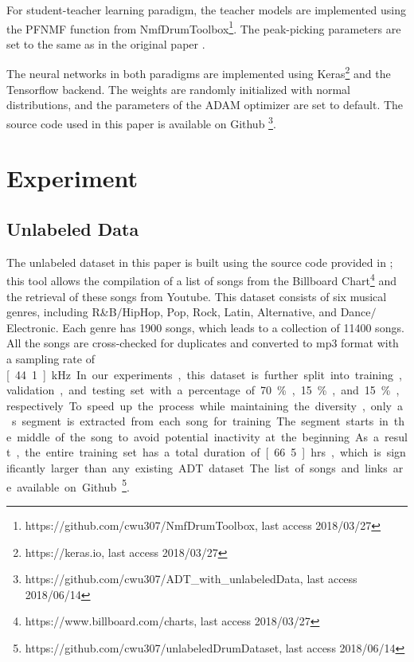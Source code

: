 \documentclass{article}
\newcommand{\comment}[1]{{\textcolor{blue}{#1}}}
\begin{document}
For student-teacher learning paradigm, the teacher models are implemented using the PFNMF function from NmfDrumToolbox\footnote{https://github.com/cwu307/NmfDrumToolbox, last access 2018/03/27}. The peak-picking parameters are set to the same as in the original paper \cite{Wu2017}.

The neural networks in both paradigms are implemented using Keras\footnote{https://keras.io, last access 2018/03/27} and the Tensorflow \cite{Abadi2016} backend. The weights are randomly initialized with normal distributions, and the parameters of the ADAM optimizer are set to default. The source code used in this paper is available on Github \footnote{https://github.com/cwu307/ADT\_with\_unlabeledData, last access 2018/06/14}.

\section{Experiment}
\label{sec:experiment}

\subsection{Unlabeled Data}

The unlabeled dataset in this paper is built using the source code provided in \cite{Wu2017}; this tool allows the compilation of a list of songs from the Billboard Chart\footnote{https://www.billboard.com/charts, last access 2018/03/27} and the retrieval of these songs from Youtube. This dataset consists of six musical genres, including R\&B$\slash$HipHop, Pop, Rock, Latin, Alternative, and  Dance$\slash$Electronic. Each genre has 1900 songs, which leads to a collection of 11400 songs. All the songs are cross-checked for duplicates and converted to mp3 format with a sampling rate of \unit[44.1]{kHz}. In our experiments, this dataset is further split into training, validation, and testing set with a percentage of 70\%, 15\%, and 15\%, respectively. To speed up the process while maintaining the diversity, only a \unit[30]{s} segment is extracted from each song for training. The segment starts in the middle of the song to avoid potential inactivity at the beginning. As a result, the entire training set has a total duration of \unit[66.5]{hrs}, which is significantly larger than any existing ADT dataset. The list of songs and links are available on Github\footnote{https://github.com/cwu307/unlabeledDrumDataset, last access 2018/06/14}. %
\end{document}
